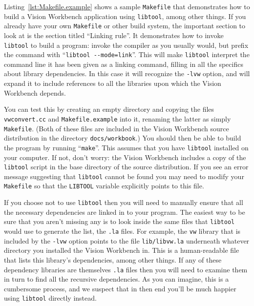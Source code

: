 Listing~\ref{lst:Makefile.example} shows a sample \verb#Makefile# 
that demonstrates how to build a Vision Workbench application using 
\verb#libtool#, among other things.  If you already have your own 
\verb#Makefile# or other build system, the important section to 
look at is the section titled ``Linking rule''.  It demonstrates 
how to invoke \verb#libtool# to build a program: invoke the compiler 
as you usually would, but prefix the command with 
``\verb#libtool --mode=link#''.  This will make \verb#libtool# 
interpret the command line it has been given as a linking command, 
filling in all the specifics about library dependencies.  In this 
case it will recognize the \verb#-lvw# option, and will expand it 
to include references to all the libraries upon which the Vision 
Workbench depends.

You can test this by creating an empty directory and copying the 
files \verb#vwconvert.cc# and \verb#Makefile.example# into it, 
renaming the latter as simply \verb#Makefile#.  (Both of these 
files are included in the Vision Workbench source distribution 
in the directory \verb#docs/workbook#.)  You should then 
be able to build the program by running ``\verb#make#''. 
This assumes that you have \verb#libtool# installed on your 
computer.  If not, don't worry: the Vision Workbench includes a 
copy of the \verb#libtool# script in the base directory of the 
source distribution.  If you see an error message suggesting that 
\verb#libtool# cannot be found you may need to modify your 
\verb#Makefile# so that the \verb#LIBTOOL# variable explicitly 
points to this file.

If you choose not to use \verb#libtool# then you will need to manually
ensure that all the necessary dependencies are linked in to your
program.  The easiest way to be sure that you aren't missing any is to
look inside the same files that \verb#libtool# would use to generate
the list, the \verb#.la# files.  For example, the \verb#vw# library
that is included by the \verb#-lvw# option points to the file
\verb#lib/libvw.la# underneath whatever directory you installed the
Vision Workbench in.  This is a human-readable file that lists this
library's dependencies, among other things.  If any of these
dependency libraries are themselves \verb#.la# files then you will
need to examine them in turn to find all the recursive dependencies.
As you can imagine, this is a cumbersome process, and we suspect that
in then end you'll be much happier using \verb#libtool# directly
instead.

\begin{center}
\end{center}


